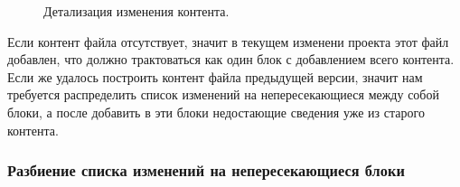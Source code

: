 \documentclass[a4paper,14pt]{extreport} %
\begin{document}
\begin{figure}[H]
\caption{Детализация изменения контента.}
\label{detalized-changes}
\end{figure}
Если контент файла отсутствует, значит в текущем изменени проекта этот файл добавлен, что должно трактоваться как один блок с добавлением всего контента. Если же удалось построить контент файла предыдущей версии, значит нам требуется распределить список изменений на непересекающиеся между собой блоки, а после добавить в эти блоки недостающие сведения уже из старого контента.

\newpage
\subsubsection{Разбиение списка изменений на непересекающиеся блоки}
\end{document}
